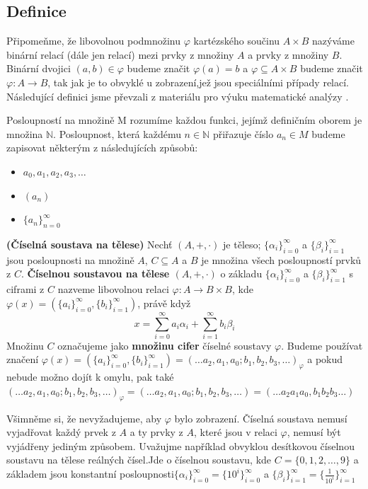 \documentclass[czech,bachelor,dept470,male]{diploma}
\newcommand{\poslbeta}{\{\beta_i\}_{i=1}^{\infty}}
\newcommand{\poslalpha}{\{\alpha_i\}_{i=0}^{\infty}}
\begin{document}
\subsection{Definice}
Připomeňme, že libovolnou podmnožinu $\varphi$ kartézského součinu $A \times B$ nazýváme binární relací (dále jen relací) mezi prvky z množiny $A$ a prvky z množiny $B$. Binární dvojici $(a,b)\in \varphi$ budeme značit $\varphi(a) = b$ a $\varphi \subseteq A \times B$ budeme značit $\varphi : A \rightarrow B$, tak jak je to obvyklé u zobrazení,\newline jež jsou speciálními případy relací.
\newline Následující definici jsme převzali z materiálu pro výuku matematické analýzy \cite{maUniverse}.
\begin{definition}
	Posloupností na množině M rozumíme každou funkci, jejímž definičním oborem je množina $\mathbb{N}$. Posloupnost, která každému $n \in \mathbb{N}$ přiřazuje číslo $a_n \in M$ budeme zapisovat některým z následujících způsobů:
	\begin{itemize}
		\item $a_0, a_1, a_2, a_3,\dots$
		\item $(a_n)$
		\item $\{a_n\}_{n=0}^{\infty}$
	\end{itemize}
\end{definition}
\begin{definition}\label{d2} \textbf{(Číselná soustava na tělese)}
	Nechť $(A,+,\cdot)$ je těleso; $\poslalpha$ a $\poslbeta$ jsou posloupnosti na množině $A$, $C\subseteq A$ a $B$ je množina všech posloupností prvků z $C$.
	\newline\textbf{Číselnou soustavou na tělese $(A,+,\cdot)$} o základu $\poslalpha$ a $\poslbeta$ s ciframi z $C$ nazveme libovolnou relaci $\varphi : A \rightarrow B\times B$, kde $\varphi(x)=\left(\{a_{i}\}_{i=0}^{\infty},\{b_{i}\}_{i=1}^{\infty}\right)$, právě když
	$$x = \sum_{i=0}^{\infty} a_{i}\alpha_{i} + \sum_{i=1}^{\infty} b_{i}\beta_{i}$$
	Množinu $C$ označujeme jako \textbf{množinu cifer} číselné soustavy $\varphi$. Budeme používat značení $\varphi(x) = \left(\{a_{i}\}_{i=0}^{\infty},\{b_{i}\}_{i=1}^{\infty}\right) = (\dots a_2,a_1,a_0;b_1, b_2, b_3, \dots)_{\varphi}$ a pokud nebude možno dojít k omylu, pak také $(\dots a_2,a_1,a_0;b_1, b_2, b_3, \dots)_{\varphi} = (\dots a_2,a_1,a_0;b_1, b_2, b_3, \dots) = (\dots a_2a_1a_0,b_1 b_2 b_3 \dots)$
\end{definition}
Všimněme si, že nevyžadujeme, aby $\varphi$ bylo zobrazení. Číselná soustava nemusí vyjadřovat každý prvek z $A$ a ty prvky z $A$, které jsou v relaci $\varphi$, nemusí být vyjádřeny jediným způsobem. Uvažujme například obvyklou desítkovou číselnou soustavu na tělese reálných čísel.\newline Jde o číselnou soustavu, kde $C = \{0, 1, 2, \dots, 9\}$ a základem jsou konstantní posloupnosti\newline $\poslalpha = \{10^i\}_{i = 0}^{\infty}$ a $\poslbeta = \{\frac{1}{10^i}\}_{i = 1}^{\infty}$
\end{document}
